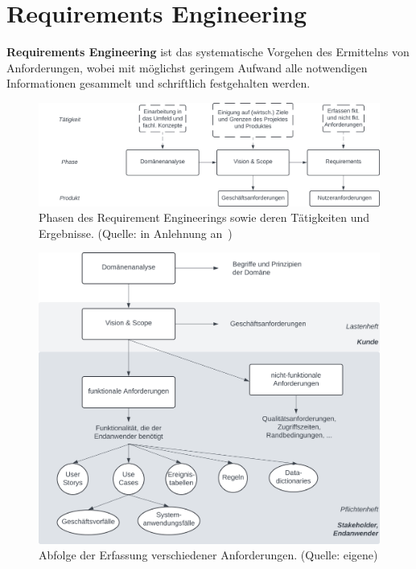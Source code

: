\section{Requirements Engineering}

\begin{tcolorbox}[title=Requirements Engineering]
    \textbf{Requirements Engineering} ist das systematische Vorgehen des Ermittelns von Anforderungen,
    wobei mit möglichst geringem Aufwand alle notwendigen Informationen gesammelt und schriftlich festgehalten werden.
\end{tcolorbox}

\begin{figure}
    \centering
    \includegraphics[scale=0.35]{chapters/Anhang/CheatSheets/img/requirementsengineering}
    \caption{Phasen des Requirement Engineerings sowie deren Tätigkeiten und Ergebnisse. (Quelle: in Anlehnung an~\cite[84]{Wed09})}
    \label{fig:requirementsengineering_cc}
\end{figure}

\begin{figure}
    \centering
    \includegraphics[scale=0.35]{chapters/Anhang/CheatSheets/img/anforderung}
    \caption{Abfolge der Erfassung verschiedener Anforderungen. (Quelle: eigene)}
    \label{fig:anforderung_cc}
\end{figure}